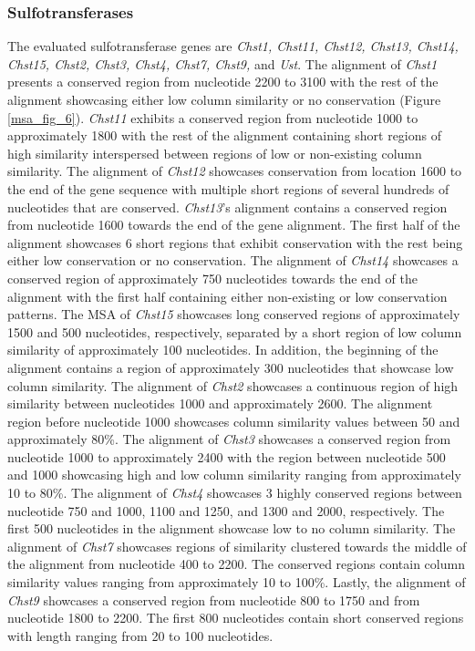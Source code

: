 \documentclass{article}
\begin{document}
\subsubsection{Sulfotransferases}
The evaluated sulfotransferase genes are \textit{Chst1, Chst11, Chst12, Chst13, Chst14, Chst15, Chst2, Chst3, Chst4, Chst7, Chst9,} and \textit{Ust}. The alignment of \textit{Chst1} presents a conserved region from nucleotide 2200 to 3100 with the rest of the alignment showcasing either low column similarity or no conservation (Figure \ref{msa_fig_6}). \textit{Chst11} exhibits a conserved region from nucleotide 1000 to approximately 1800 with the rest of the alignment containing short regions of high similarity interspersed between regions of low or non-existing column similarity. The alignment of \textit{Chst12} showcases conservation from location 1600 to the end of the gene sequence with multiple short regions of several hundreds of nucleotides that are conserved. \textit{Chst13}'s alignment contains a conserved region from nucleotide 1600 towards the end of the gene alignment. The first half of the alignment showcases 6 short regions that exhibit conservation with the rest being either low conservation or no conservation. The alignment of \textit{Chst14} showcases a conserved region of approximately 750 nucleotides towards the end of the alignment with the first half containing either non-existing or low conservation patterns. The MSA of \textit{Chst15} showcases long conserved regions of approximately 1500 and 500 nucleotides, respectively, separated by a short region of low column similarity of approximately 100 nucleotides. In addition, the beginning of the alignment contains a region of approximately 300 nucleotides that showcase low column similarity. The alignment of \textit{Chst2} showcases a continuous region of high similarity between nucleotides 1000 and approximately 2600. The alignment region before nucleotide 1000 showcases column similarity values between 50 and approximately 80\%. The alignment of \textit{Chst3} showcases a conserved region from nucleotide 1000 to approximately 2400 with the region between nucleotide 500 and 1000 showcasing high and low column similarity ranging from approximately 10 to 80\%. The alignment of \textit{Chst4} showcases 3 highly conserved regions between nucleotide 750 and 1000, 1100 and 1250, and 1300 and 2000, respectively. The first 500 nucleotides in the alignment showcase low to no column similarity. The alignment of \textit{Chst7} showcases regions of similarity clustered towards the middle of the alignment from nucleotide 400 to 2200. The conserved regions contain column similarity values ranging from approximately 10 to 100\%. Lastly, the alignment of \textit{Chst9} showcases a conserved region from nucleotide 800 to 1750 and from nucleotide 1800 to 2200. The first 800 nucleotides contain short conserved regions with length ranging from 20 to 100 nucleotides. 
\end{document}
